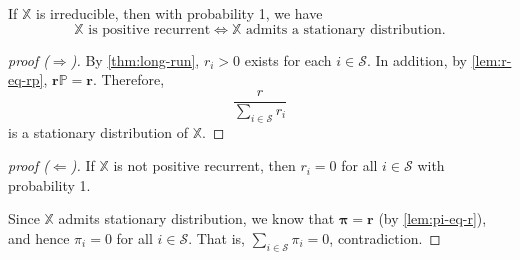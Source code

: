 \begin{corollary}
If $ \mathbb{X} $ is irreducible, then with probability 1, we have
\[ \mathbb{X} \text{ is positive recurrent}
  \Leftrightarrow \mathbb{X} \text{ admits a stationary distribution.} \]

\begin{proof}[proof ($ \Rightarrow $)]
By \autoref{thm:long-run}, $ r_{i} > 0 $ exists for each $ i \in \mathcal{S} $. In addition, by \autoref{lem:r-eq-rp}, $ \mathbf{r}\mathbb{P} = \mathbf{r} $. Therefore,
\[ \frac{r}{\sum_{i \in \mathcal{S}} r_{i}} \]
is a stationary distribution of $ \mathbb{X} $.
\end{proof}

\begin{proof}[proof ($ \Leftarrow $)]
If $ \mathbb{X} $ is not positive recurrent, then $ r_{i} = 0 $ for all $ i \in \mathcal{S} $ with probability 1.

Since $ \mathbb{X} $ admits stationary distribution, we know that $ \boldsymbol\pi = \mathbf{r} $ (by \autoref{lem:pi-eq-r}), and hence $ \pi_{i} = 0 $ for all $ i \in \mathcal{S} $. That is, $ \sum_{i \in \mathcal{S}} \pi_{i} = 0 $, contradiction.
\end{proof}
\end{corollary}
